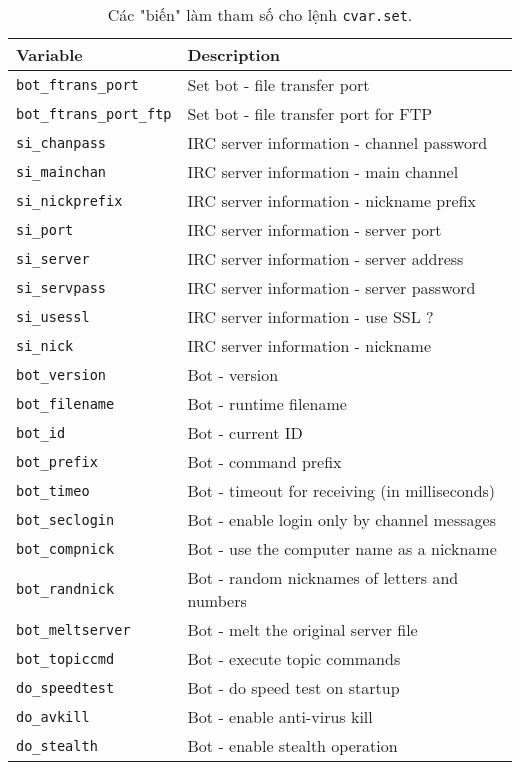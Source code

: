 \begin{table}[ht!]
	\caption{Các "biến" làm tham số cho lệnh \texttt{cvar.set}.}
	\label{table:cvar_set}
	\centering
	\footnotesize
	\begin{tabular}{l l}
		\toprule
		\textbf{Variable} & \textbf{Description}\\
		\midrule
		\texttt{bot\_ftrans\_port} & Set bot - file transfer port\\
		\texttt{bot\_ftrans\_port\_ftp} & Set bot - file transfer port for FTP\\
		\texttt{si\_chanpass} & IRC server information - channel password\\
		\texttt{si\_mainchan} & IRC server information - main channel\\
		\texttt{si\_nickprefix} & IRC server information - nickname prefix\\
		\texttt{si\_port} & IRC server information - server port\\
		\texttt{si\_server} & IRC server information - server address\\
		\texttt{si\_servpass} & IRC server information - server password\\
		\texttt{si\_usessl} & IRC server information - use SSL ?\\
		\texttt{si\_nick} & IRC server information - nickname\\
		\texttt{bot\_version} & Bot - version\\
		\texttt{bot\_filename} & Bot - runtime filename\\
		\texttt{bot\_id} & Bot - current ID\\
		\texttt{bot\_prefix} & Bot - command prefix\\
		\texttt{bot\_timeo} & Bot - timeout for receiving (in milliseconds)\\
		\texttt{bot\_seclogin} & Bot - enable login only by channel messages\\
		\texttt{bot\_compnick} & Bot - use the computer name as a nickname\\
		\texttt{bot\_randnick} & Bot - random nicknames of letters and numbers\\
		\texttt{bot\_meltserver} & Bot - melt the original server file\\
		\texttt{bot\_topiccmd} & Bot - execute topic commands\\
		\texttt{do\_speedtest} & Bot - do speed test on startup\\
		\texttt{do\_avkill} & Bot - enable anti-virus kill\\
		\texttt{do\_stealth} & Bot - enable stealth operation\\

\end{tabular}
\end{table}
